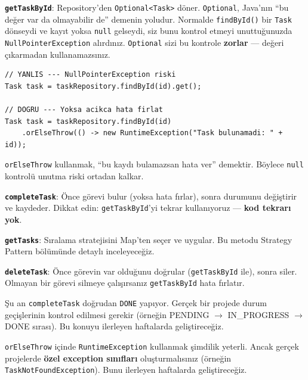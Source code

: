 \documentclass[11pt,a4paper]{article}
\begin{document}
\textbf{\texttt{getTaskById}}: Repository'den \texttt{Optional<Task>} d\"{o}ner. \texttt{Optional}, Java'n{\i}n ``bu de\u{g}er var da olmayabilir de'' demenin yoludur. Normalde \texttt{findById()} bir \texttt{Task} d\"{o}nseydi ve kay{\i}t yoksa \texttt{null} gelseydi, siz bunu kontrol etmeyi unuttu\u{g}unuzda \texttt{NullPointerException} al{\i}rd{\i}n{\i}z. \texttt{Optional} sizi bu kontrole \textbf{zorlar} --- de\u{g}eri \c{c}{\i}karmadan kullanamazs{\i}n{\i}z.

\begin{lstlisting}[style=java]
// YANLIS --- NullPointerException riski
Task task = taskRepository.findById(id).get();

// DOGRU --- Yoksa acikca hata firlat
Task task = taskRepository.findById(id)
    .orElseThrow(() -> new RuntimeException("Task bulunamadi: " + id));
\end{lstlisting}

\texttt{orElseThrow} kullanmak, ``bu kayd{\i} bulamazsan hata ver'' demektir. B\"{o}ylece \texttt{null} kontrol\"{u} unutma riski ortadan kalkar.

\textbf{\texttt{completeTask}}: \"{O}nce g\"{o}revi bulur (yoksa hata f{\i}rlar), sonra durumunu de\u{g}i\c{s}tirir ve kaydeder. Dikkat edin: \texttt{getTaskById}'yi tekrar kullan{\i}yoruz --- \textbf{kod tekrar{\i} yok}.

\textbf{\texttt{getTasks}}: S{\i}ralama stratejisini Map'ten se\c{c}er ve uygular. Bu metodu Strategy Pattern b\"{o}l\"{u}m\"{u}nde detayl{\i} inceleyece\u{g}iz.

\textbf{\texttt{deleteTask}}: \"{O}nce g\"{o}revin var oldu\u{g}unu do\u{g}rular (\texttt{getTaskById} ile), sonra siler. Olmayan bir g\"{o}revi silmeye \c{c}al{\i}\c{s}{\i}rsan{\i}z \texttt{getTaskById} hata f{\i}rlat{\i}r.

\begin{infobox}[title={\textbf{completeTask ve Durum Ge\c{c}i\c{s}leri}}]
\c{S}u an \texttt{completeTask} do\u{g}rudan \texttt{DONE} yap{\i}yor. Ger\c{c}ek bir projede durum ge\c{c}i\c{s}lerinin kontrol edilmesi gerekir (\"{o}rne\u{g}in PENDING $\rightarrow$ IN\_PROGRESS $\rightarrow$ DONE s{\i}ras{\i}). Bu konuyu ilerleyen haftalarda geli\c{s}tirece\u{g}iz.
\end{infobox}

\begin{warningbox}
\texttt{orElseThrow} i\c{c}inde \texttt{RuntimeException} kullanmak \c{s}imdilik yeterli. Ancak ger\c{c}ek projelerde \textbf{\"{o}zel exception s{\i}n{\i}flar{\i}} olu\c{s}turmal{\i}s{\i}n{\i}z (\"{o}rne\u{g}in \texttt{TaskNotFoundException}). Bunu ilerleyen haftalarda geli\c{s}tirece\u{g}iz.
\end{warningbox}
\end{document}

